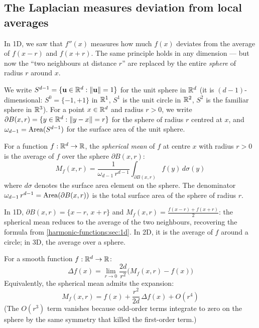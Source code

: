 \begin{notechapter}
\subsection{The Laplacian measures deviation from local averages}

In 1D, we saw that $f''(x)$ measures how much $f(x)$ deviates from the
average of $f(x-r)$ and $f(x+r)$. The same principle holds in any
dimension --- but now the ``two neighbours at distance $r$'' are replaced by
the entire \emph{sphere} of radius $r$ around $x$.

We write $S^{d-1} = \{\mathbf{u} \in \mathbb{R}^d : \|\mathbf{u}\| = 1\}$ for the
unit sphere in $\mathbb{R}^d$ (it is $(d{-}1)$-dimensional: $S^0 = \{-1,+1\}$ in
$\mathbb{R}^1$, $S^1$ is the unit circle in $\mathbb{R}^2$, $S^2$ is the familiar sphere in
$\mathbb{R}^3$). For a point $x \in \mathbb{R}^d$ and radius $r > 0$, we write
$\partial B(x,r) = \{y \in \mathbb{R}^d : \|y - x\| = r\}$ for the sphere of
radius $r$ centred at $x$, and $\omega_{d-1} = \operatorname{Area}(S^{d-1})$ for the
surface area of the unit sphere.

\begin{definition}
\label{harmonic-functions:def:spherical_mean}
For a function $f : \mathbb{R}^d \to \mathbb{R}$, the \emph{spherical mean} of $f$ at
centre $x$ with radius $r > 0$ is the average of $f$ over the sphere
$\partial B(x,r)$:
\begin{equation}
M_f(x, r) = \frac{1}{\omega_{d-1}\,r^{d-1}}
  \int_{\partial B(x,r)} f(y)\,d\sigma(y)
\end{equation}
where $d\sigma$ denotes the surface area element on the sphere. The
denominator $\omega_{d-1}\,r^{d-1} = \operatorname{Area}(\partial B(x,r))$ is the total
surface area of the sphere of radius $r$.
\end{definition}

In 1D, $\partial B(x,r) = \{x-r,\, x+r\}$ and
$M_f(x,r) = \frac{f(x-r) + f(x+r)}{2}$: the spherical mean reduces to
the average of the two neighbours, recovering the formula from
\cref{harmonic-functions:sec:1d}. In 2D, it is the average of $f$ around a circle; in
3D, the average over a sphere.

\begin{theorem}
\label{harmonic-functions:thm:laplacian_average}
For a smooth function $f: \mathbb{R}^d \to \mathbb{R}$:
\begin{equation}
\label{harmonic-functions:eq:laplacian_avg}
\boxed{\Delta f(x) = \lim_{r \to 0} \frac{2d}{r^2}
  \bigl(M_f(x,r) - f(x)\bigr)}
\end{equation}
Equivalently, the spherical mean admits the expansion:
\begin{equation}
\label{harmonic-functions:eq:spherical_mean_expansion}
M_f(x,r) = f(x) + \frac{r^2}{2d}\,\Delta f(x) + O(r^4)
\end{equation}
(The $O(r^3)$ term vanishes because odd-order terms integrate to zero on
the sphere by the same symmetry that killed the first-order term.)
\end{theorem}


\end{notechapter}
